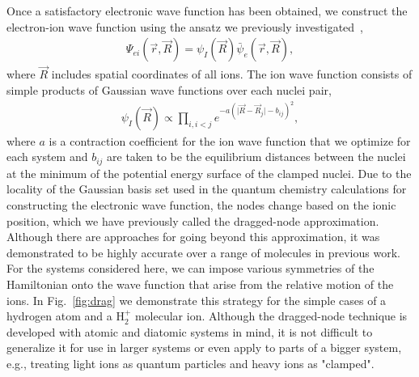 Once a satisfactory electronic wave function has been obtained, we construct the electron-ion wave function using the ansatz we previously investigated~\cite{Tubman_ECG},
\begin{align}
\Psi_{ei}(\vec{r},\vec{R})=\psi_I(\vec{R})\bar{\psi}_e(\vec{r},\vec{R}), \label{eq:psi}
\end{align}
where $\vec{R}$ includes spatial coordinates of all ions. The ion wave function consists of simple products of Gaussian wave functions over each nuclei pair,
\begin{align}
\psi_I(\vec{R})\propto \prod\limits_{i,i<j}e^{-a(\vert \vec{R}-\vec{R}_j\vert-b_{ij})^2},
\label{wfs_ions}
\end{align}
where $a$ is a contraction coefficient for the ion wave function that we optimize for each system and $b_{ij}$ are taken to be the equilibrium distances between the nuclei at the minimum of the potential energy surface of the clamped nuclei.  Due to the locality of the Gaussian basis set used in the quantum chemistry calculations for constructing the electronic wave function, the nodes change based on the ionic position, which we have previously called the dragged-node approximation.  Although there are approaches for going beyond this approximation, it was demonstrated to be highly accurate over a range of molecules in previous work.  For the systems considered here, we can impose various symmetries of the Hamiltonian onto the wave function that arise from the relative motion of the ions.  In Fig.~\ref{fig:drag} we demonstrate this strategy for the simple cases of a hydrogen atom and a H$_2^+$ molecular ion. Although the dragged-node technique is developed with atomic and diatomic systems in mind, it is not difficult to generalize it for use in larger systems or even apply to parts of a bigger system, e.g., treating light ions as quantum particles and heavy ions as "clamped". 